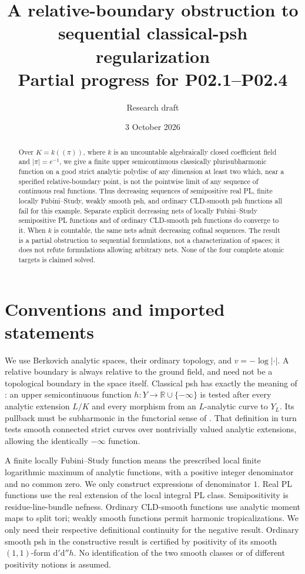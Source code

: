 \documentclass[11pt]{article}
\title{A relative-boundary obstruction to sequential classical-psh regularization\\
\large Partial progress for P02.1--P02.4}
\author{Research draft}
\date{3 October 2026}
\newcommand{\dd}{\mathrm d'\mathrm d''}
\begin{document}
\maketitle
\begin{abstract}
Over $K=k((\pi))$, where $k$ is an uncountable algebraically closed
coefficient field and $|\pi|=e^{-1}$, we give a finite upper semicontinuous
classically plurisubharmonic function on a good strict analytic polydisc
of any dimension at least two which, near a specified relative-boundary
point, is not the pointwise limit of any sequence of continuous real
functions. Thus decreasing sequences of semipositive real PL, finite
locally Fubini--Study, weakly smooth psh, and ordinary CLD-smooth psh
functions all fail for this example. Separate explicit decreasing nets
of locally Fubini--Study semipositive PL functions and of ordinary
CLD-smooth psh functions do converge to it. When $k$ is countable, the
same nets admit decreasing cofinal sequences. The result is a partial
obstruction to sequential formulations, not a characterization of spaces;
it does not refute formulations allowing arbitrary nets. None of the
four complete atomic targets is claimed solved.
\end{abstract}

\section{Conventions and imported statements}
We use Berkovich analytic spaces, their ordinary topology, and
$v=-\log|\cdot|$. A relative boundary is always relative to the ground
field, and need not be a topological boundary in the space itself.
Classical psh has exactly the meaning of \cite[Definition~4.1]{GR}:
an upper semicontinuous function $h:Y\to\mathbb R\cup\{-\infty\}$ is
tested after every analytic extension $L/K$ and every morphism from an
$L$-analytic curve to $Y_L$. Its pullback must be subharmonic in the
functorial sense of \cite[Definition~3.4]{GR}. That definition in turn
tests smooth connected strict curves over nontrivially valued analytic
extensions, allowing the identically $-\infty$ function.

A finite locally Fubini--Study function means the prescribed local
finite logarithmic maximum of analytic functions, with a positive
integer denominator and no common zero. We only construct expressions
of denominator $1$. Real PL functions use the real extension of the
local integral PL class. Semipositivity is residue-line-bundle nefness.
Ordinary CLD-smooth functions use analytic moment maps to split tori;
weakly smooth functions permit harmonic tropicalizations. We only need
their respective definitional continuity for the negative result.
Ordinary smooth psh in the constructive result is certified by positivity
of its smooth $(1,1)$-form $\dd h$. No identification of the two smooth
classes or of different positivity notions is assumed.
\end{document}
